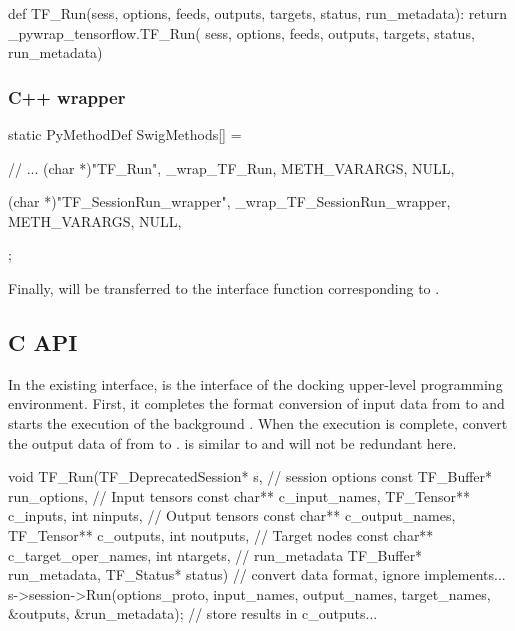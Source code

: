 \begin{content}
\begin{leftbar}
\begin{python}[caption={tensorflow/bazel-bin/tensorflow/python/pywrap\_tensorflow\_internal.py}]
def TF_Run(sess, options, feeds, outputs, 
  targets, status, run_metadata):
  return _pywrap_tensorflow.TF_Run(
    sess, options, feeds, outputs, targets, status, run_metadata)
\end{python}
\end{leftbar}

\subsubsection{C++ wrapper}

\begin{leftbar}
\begin{c++}[caption={tensorflow/bazel-bin/tensorflow/python/pywrap\_tensorflow\_internal.cc}]
static PyMethodDef SwigMethods[] = {
  // ...
  { (char *)"TF_Run", 
    _wrap_TF_Run, METH_VARARGS, NULL},

  { (char *)"TF_SessionRun_wrapper", 
    _wrap_TF_SessionRun_wrapper, METH_VARARGS, NULL},
};
\end{c++}
\end{leftbar}

Finally,  will be transferred to the  interface function corresponding to .

\subsection{C API}

In the existing interface,  is the interface of the  docking upper-level programming environment. First, it completes the format conversion of input data from  to \cpp{} and starts the execution of the background . When the execution is complete, convert the output data of  from \cpp{} to .  is similar to  and will not be redundant here.

\begin{leftbar}
\begin{c++}[caption={tensorflow/c/c\_api.c}]
void TF_Run(TF_DeprecatedSession* s, 
  // session options
  const TF_Buffer* run_options,
  // Input tensors
  const char** c_input_names, TF_Tensor** c_inputs, int ninputs,
  // Output tensors
  const char** c_output_names, TF_Tensor** c_outputs, int noutputs,
  // Target nodes
  const char** c_target_oper_names, int ntargets,
  // run\_metadata
  TF_Buffer* run_metadata, TF_Status* status) {
  // convert data format, ignore implements...
  s->session->Run(options_proto, input_names, output_names,
                  target_names, &outputs, &run_metadata); 
  // store results in c\_outputs...
}


\end{c++}
\end{leftbar}
\end{content}
